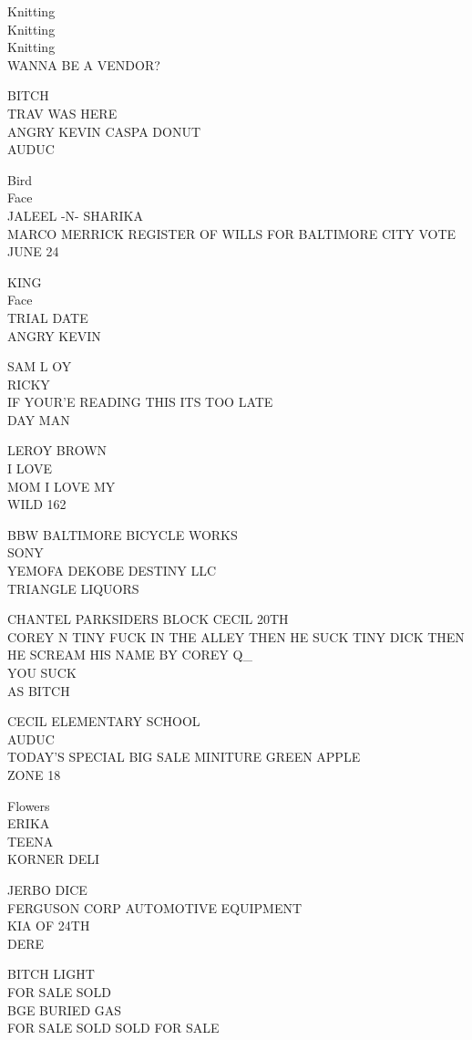 \documentclass[10pt,letterpaper]{article}
\begin{document}
Knitting\\
Knitting\\
Knitting\\
WANNA BE A VENDOR?

BITCH\\
TRAV WAS HERE\\
ANGRY KEVIN CASPA DONUT\\
AUDUC

Bird\\
Face\\
JALEEL {-}N{-} SHARIKA\\
MARCO MERRICK REGISTER OF WILLS FOR BALTIMORE CITY VOTE JUNE 24

KING\\
Face\\
TRIAL DATE\\
ANGRY KEVIN

SAM L OY\\
RICKY\\
IF YOUR'E READING THIS ITS TOO LATE\\
DAY MAN

LEROY BROWN\\
I LOVE\\
MOM I LOVE MY\\
WILD 162

BBW BALTIMORE BICYCLE WORKS\\
SONY\\
YEMOFA DEKOBE DESTINY LLC\\
TRIANGLE LIQUORS

CHANTEL PARKSIDERS BLOCK CECIL 20TH\\
COREY N TINY FUCK IN THE ALLEY THEN HE SUCK TINY DICK THEN HE SCREAM HIS NAME BY COREY Q\_\\
YOU SUCK\\
AS BITCH

CECIL ELEMENTARY SCHOOL\\
AUDUC\\
TODAY'S SPECIAL BIG SALE MINITURE GREEN APPLE\\
ZONE 18

Flowers\\
ERIKA\\
TEENA\\
KORNER DELI

JERBO DICE\\
FERGUSON CORP AUTOMOTIVE EQUIPMENT\\
KIA OF 24TH\\
DERE

BITCH LIGHT\\
FOR SALE SOLD\\
BGE BURIED GAS\\
FOR SALE SOLD SOLD FOR SALE
\end{document}
